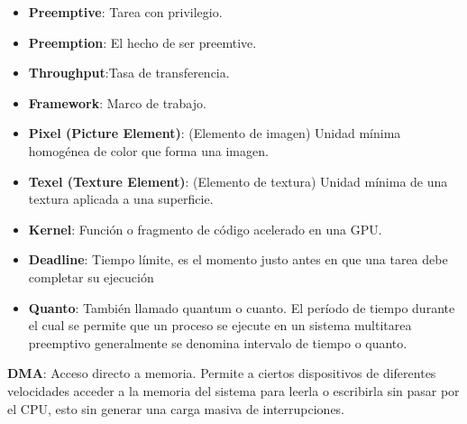 \begin{itemize}
\item \textbf{Preemptive}: Tarea con privilegio.
\item \textbf{Preemption}: El hecho de ser preemtive.
\item \textbf{Throughput}:Tasa de transferencia.
\item \textbf{Framework}: Marco de trabajo.
\item \textbf{Pixel (Picture Element)}: (Elemento de imagen) Unidad mínima homogénea de color que forma una imagen.
\item \textbf{Texel (Texture Element)}: (Elemento de textura)  Unidad mínima de una textura aplicada a una superficie.
\item \textbf{Kernel}: Función o fragmento de código acelerado en una GPU.
\item \textbf{Deadline}: Tiempo límite, es el momento justo antes en que una tarea debe completar su ejecución

\item \textbf{Quanto}: También llamado quantum o cuanto. El período de tiempo durante el cual se permite que un proceso se ejecute en un sistema multitarea preemptivo generalmente se denomina intervalo de tiempo o quanto.
\end{itemize}  

\item \textbf{DMA}: Acceso directo a memoria. Permite a ciertos dispositivos de diferentes velocidades acceder a la memoria del sistema para leerla o escribirla sin pasar por el CPU, esto sin generar una carga masiva de interrupciones.

